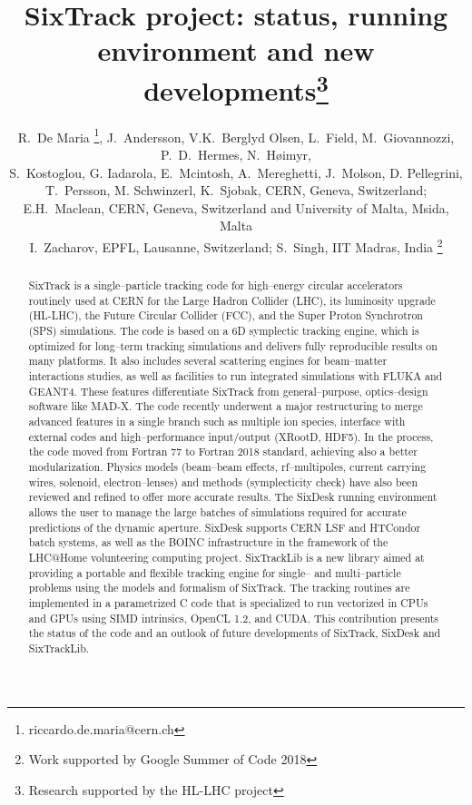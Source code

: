 \documentclass[a4paper,
              ]{jacow}
\begin{document}
\title{SixTrack project: status, running environment and new developments\thanks{Research supported by the HL-LHC project}}

\author{
R.~De Maria \thanks{riccardo.de.maria@cern.ch},
J.~Andersson,
V.K.~Berglyd Olsen,
L.~Field,
M.~Giovannozzi,
P.~D.~Hermes,
N.~H\o imyr, \\
S.~Kostoglou,
G. Iadarola,
E.~Mcintosh,
A.~Mereghetti,
J.~Molson,
D. Pellegrini,\\
T.~Persson,
M. Schwinzerl,
K.~Sjobak,
CERN, Geneva, Switzerland; \\
E.H.~Maclean, CERN, Geneva, Switzerland and University of Malta, Msida, Malta\\
I.~Zacharov, EPFL, Lausanne, Switzerland;
S.~Singh, IIT Madras, India \thanks{Work supported by Google Summer of Code 2018}
}
\maketitle

%
\begin{abstract}
SixTrack is a single--particle tracking code for high--energy circular accelerators routinely used at CERN for the Large Hadron Collider (LHC), its luminosity upgrade (HL-LHC), the Future Circular Collider (FCC), and the Super Proton Synchrotron (SPS) simulations. The code is based on a 6D symplectic tracking engine, which is optimized for long--term tracking simulations and delivers fully reproducible results on many platforms. It also includes several scattering engines for beam--matter interactions studies, as well as facilities to run integrated simulations with FLUKA and GEANT4. These features differentiate SixTrack from general--purpose, optics--design software like MAD-X. The code recently underwent a major restructuring to merge advanced features in a single branch such as multiple ion species, interface with external codes and high--performance input/output (XRootD, HDF5). In the process, the code moved from Fortran 77 to Fortran 2018 standard, achieving also a better modularization. Physics models (beam--beam effects, rf--multipoles, current carrying wires, solenoid, electron--lenses) and methods (symplecticity check) have also been reviewed and refined to offer more accurate results. The SixDesk running environment allows the user to manage the large batches of simulations required for accurate predictions of the dynamic aperture. SixDesk supports CERN LSF and HTCondor batch systems, as well as the BOINC infrastructure in the framework of the LHC@Home volunteering computing project. SixTrackLib is a new library aimed at providing a portable and flexible tracking engine for single-- and multi--particle problems using the models and formalism of SixTrack. The tracking routines are implemented in a parametrized C code that is specialized to run vectorized in CPUs and GPUs using SIMD intrinsics, OpenCL 1.2, and CUDA. This contribution presents the status of the code and an outlook of future developments of SixTrack, SixDesk and SixTrackLib.
\end{abstract}
\end{document}
